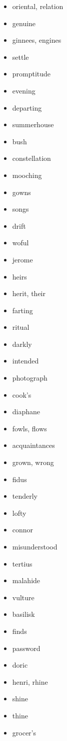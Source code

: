 \documentclass{article}
\begin{document}
\begin{itemize}
    \item oriental, relation
    \item genuine
    \item ginnees, engines
    \item settle
    \item promptitude
    \item evening
    \item departing
    \item summerhouse
    \item bush
    \item constellation
    \item mooching
    \item gowns
    \item songs
    \item drift
    \item woful
    \item jerome
    \item heirs
    \item herit, their
    \item farting
    \item ritual
    \item darkly
    \item intended
    \item photograph
    \item cook's
    \item diaphane
    \item fowls, flows
    \item acquaintances
    \item grown, wrong
    \item fidus
    \item tenderly
    \item lofty
    \item connor
    \item misunderstood
    \item tertius
    \item malahide
    \item vulture
    \item basilisk
    \item finds
    \item password
    \item doric
    \item henri, rhine
    \item shine
    \item thine
    \item grocer's

\end{itemize}
\end{document}

